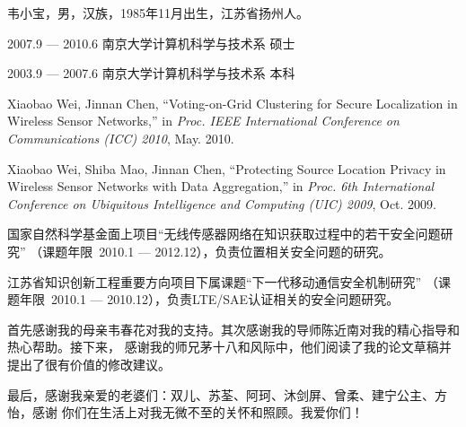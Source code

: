 \documentclass[oneside, phd]{njuthesis}
\begin{document}

\begin{resume}
\begin{authorinfo}
\noindent 韦小宝，男，汉族，1985年11月出生，江苏省扬州人。
\end{authorinfo}
\begin{education}
\item[2007.9 --- 2010.6] 南京大学计算机科学与技术系 \hfill 硕士
\item[2003.9 --- 2007.6] 南京大学计算机科学与技术系 \hfill 本科
\end{education}
\begin{publications}
\item Xiaobao Wei, Jinnan Chen, ``Voting-on-Grid Clustering for Secure
  Localization in Wireless Sensor Networks,'' in \emph{Proc. IEEE International
    Conference on Communications (ICC) 2010}, May. 2010.
\item Xiaobao Wei, Shiba Mao, Jinnan Chen, ``Protecting Source Location Privacy
  in Wireless Sensor Networks with Data Aggregation,'' in \emph{Proc. 6th
    International Conference on Ubiquitous Intelligence and Computing (UIC)
    2009}, Oct. 2009.
\end{publications}
\begin{projects}
\item 国家自然科学基金面上项目``无线传感器网络在知识获取过程中的若干安全问题研究''
（课题年限~2010.1 --- 2012.12），负责位置相关安全问题的研究。
\item 江苏省知识创新工程重要方向项目下属课题``下一代移动通信安全机制研究''
（课题年限~2010.1 --- 2010.12），负责LTE/SAE认证相关的安全问题研究。
\end{projects}
\end{resume}


\begin{acknowledgement}
  首先感谢我的母亲韦春花对我的支持。其次感谢我的导师陈近南对我的精心指导和热心帮助。接下来，
  感谢我的师兄茅十八和风际中，他们阅读了我的论文草稿并提出了很有价值的修改建议。

  最后，感谢我亲爱的老婆们：双儿、苏荃、阿珂、沐剑屏、曾柔、建宁公主、方怡，感谢
  你们在生活上对我无微不至的关怀和照顾。我爱你们！
\end{acknowledgement}
\end{document}
